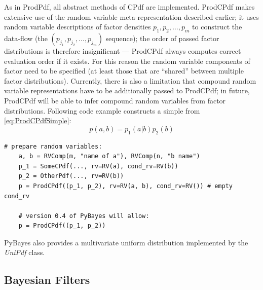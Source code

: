 As in ProdPdf, all abstract methods of CPdf are implemented.
ProdCPdf makes extensive use of the random variable meta-representation described earlier; it uses
random variable descriptions of factor densities \(p_1, p_2, \dotsc, p_m\) to construct the
data-flow (the \((p_{j_1}, p_{j_2}, \dotsc, p_{j_m})\) sequence); the order of passed factor
distributions is therefore insignificant --- ProdCPdf always computes correct evaluation order if
it exists. For this reason the random variable components of factor {\pdfs} need to be specified
(at least those that are ``shared'' between multiple factor distributions). Currently, there is also
a limitation that compound random variable representations have to be additionally passed to ProdCPdf;
in future, ProdCPdf will be able to infer compound random variables from factor distributions.
Following code example constructs a simple {\pdf} from \eqref{eq:ProdCPdfSimple}:
\begin{equation} \label{eq:ProdCPdfSimple}
	p(a,b) = p_1(a|b) p_2(b)
\end{equation}

\begin{Verbatim}[samepage=true,gobble=1,label=ProdCPdf example,frame=single]
	# prepare random variables:
	a, b = RVComp(m, "name of a"), RVComp(n, "b name")
	p_1 = SomeCPdf(..., rv=RV(a), cond_rv=RV(b))
	p_2 = OtherPdf(..., rv=RV(b))
	p = ProdCPdf((p_1, p_2), rv=RV(a, b), cond_rv=RV()) # empty cond_rv

	# version 0.4 of PyBayes will allow:
	p = ProdCPdf((p_1, p_2))
\end{Verbatim}
PyBayes also provides a multivariate uniform distribution implemented by the \emph{UniPdf} class.

\subsection{Bayesian Filters}

